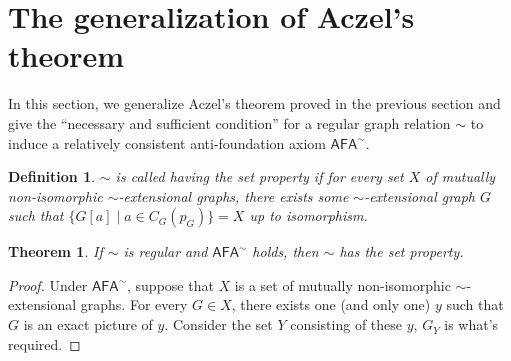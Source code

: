 \documentclass{amsart}
\newcommand{\afa}{\mathsf{AFA}}
\newtheorem{theorem}{Theorem}
\newtheorem{definition}{Definition}
\begin{document}
\section{The generalization of Aczel's theorem}

In this section, we generalize Aczel's theorem proved in the previous section and give the ``necessary and sufficient condition'' for a regular graph relation $\sim$ to induce a relatively consistent anti-foundation axiom $\afa^\sim$.

\begin{definition}
    $\sim$ is called having the set property if for every set $X$ of mutually non-isomorphic $\sim$-extensional graphs, there exists some $\sim$-extensional graph $G$ such that $\{G[a]\mid a\in C_G(p_G)\}=X$ up to isomorphism.
\end{definition}

\begin{theorem}
    If $\sim$ is regular and $\afa^\sim$ holds, then $\sim$ has the set property.
\end{theorem}
\begin{proof}
    Under $\afa^\sim$, suppose that $X$ is a set of mutually non-isomorphic $\sim$-extensional graphs. For every $G \in X$, there exists one (and only one) $y$ such that $G$ is an exact picture of $y$. Consider the set $Y$ consisting of these $y$, $G_Y$ is what's required.
\end{proof}
\end{document}
